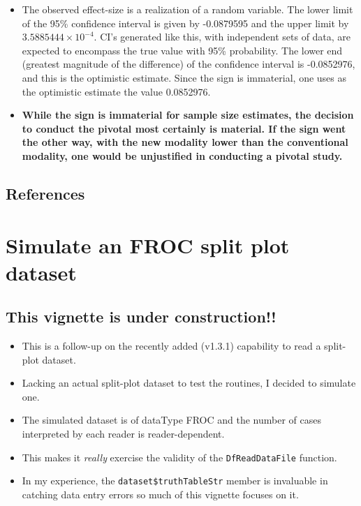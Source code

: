 \documentclass[]{book}
\providecommand{\tightlist}{%
  \setlength{\itemsep}{0pt}\setlength{\parskip}{0pt}}
\begin{document}
\begin{itemize}
\item
  The observed effect-size is a realization of a random variable. The lower limit of the 95\% confidence interval is given by -0.0879595 and the upper limit by \ensuremath{3.5885444\times 10^{-4}}. CI's generated like this, with independent sets of data, are expected to encompass the true value with 95\% probability. The lower end (greatest magnitude of the difference) of the confidence interval is -0.0852976, and this is the optimistic estimate. Since the sign is immaterial, one uses as the optimistic estimate the value 0.0852976.
\item
  \textbf{While the sign is immaterial for sample size estimates, the decision to conduct the pivotal most certainly is material. If the sign went the other way, with the new modality lower than the conventional modality, one would be unjustified in conducting a pivotal study.}
\end{itemize}

\hypertarget{references-8}{%
\section{References}\label{references-8}}

\hypertarget{SimufrocSpdataset}{%
\chapter{Simulate an FROC split plot dataset}\label{SimufrocSpdataset}}

\hypertarget{this-vignette-is-under-construction}{%
\section{This vignette is under construction!!}\label{this-vignette-is-under-construction}}

\begin{itemize}
\tightlist
\item
  This is a follow-up on the recently added (v1.3.1) capability to read a split-plot dataset.
\item
  Lacking an actual split-plot dataset to test the routines, I decided to simulate one.
\item
  The simulated dataset is of dataType FROC and the number of cases interpreted by each reader is reader-dependent.
\item
  This makes it \emph{really} exercise the validity of the \texttt{DfReadDataFile} function.
\item
  In my experience, the \texttt{dataset\$truthTableStr} member is invaluable in catching data entry errors so much of this vignette focuses on it.
\end{itemize}
\end{document}
